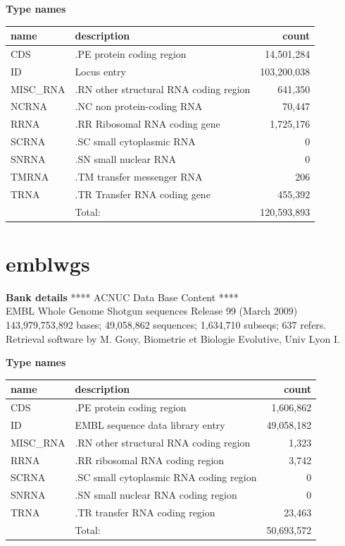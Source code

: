 \documentclass{article}
\begin{document}
\begin{Schunk}
\textbf{Type names}
\noindent\begin{tabular}{llr}
\hline \hline
name & description & count \\
\hline
CDS  &  .PE protein coding region  &  14,501,284 \\
ID  &  Locus entry  &  103,200,038 \\
MISC\_RNA  &  .RN other structural RNA coding region  &  641,350 \\
NCRNA  &  .NC non protein-coding RNA  &  70,447 \\
RRNA  &  .RR Ribosomal RNA coding gene  &  1,725,176 \\
SCRNA  &  .SC small cytoplasmic RNA  &  0 \\
SNRNA  &  .SN small nuclear RNA  &  0 \\
TMRNA  &  .TM transfer messenger RNA  &  206 \\
TRNA  &  .TR Transfer RNA coding gene  &  455,392 \\
\hline
 & Total: & 120,593,893 \\
\hline \hline
\end{tabular}

\section{ emblwgs }
\textbf{Bank details}
             ****     ACNUC Data Base Content      ****                         \\
        EMBL Whole Genome Shotgun sequences Release 99  (March 2009)  \\
143,979,753,892 bases; 49,058,862 sequences; 1,634,710 subseqs; 637 refers.\\
Retrieval software by M. Gouy, Biometrie et Biologie Evolutive, Univ Lyon I. 

\textbf{Type names}
\noindent\begin{tabular}{llr}
\hline \hline
name & description & count \\
\hline
CDS  &  .PE protein coding region  &  1,606,862 \\
ID  &  EMBL sequence data library entry  &  49,058,182 \\
MISC\_RNA  &  .RN other structural RNA coding region  &  1,323 \\
RRNA  &  .RR ribosomal RNA coding region  &  3,742 \\
SCRNA  &  .SC small cytoplasmic RNA coding region  &  0 \\
SNRNA  &  .SN small nuclear RNA coding region  &  0 \\
TRNA  &  .TR transfer RNA coding region  &  23,463 \\
\hline
 & Total: & 50,693,572 \\
\hline \hline
\end{tabular}


\end{Schunk}
\end{document}
